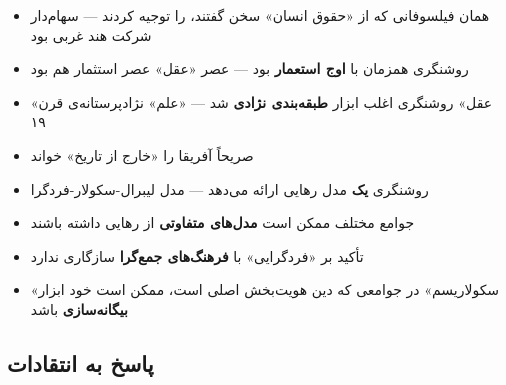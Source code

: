 \begin{tcolorbox}[enemybox, title={نقد ۲: تناقض درونی}]
\begin{itemize}
\item همان فیلسوفانی که از «حقوق انسان» سخن گفتند، 
  را توجیه کردند —  سهام‌دار شرکت هند غربی بود
\item روشنگری همزمان با \textbf{اوج استعمار} بود — عصر «عقل» عصر
  استثمار هم بود
\item «عقل» روشنگری اغلب ابزار \textbf{طبقه‌بندی نژادی} شد — «علم»
  نژادپرستانه‌ی قرن ۱۹
\item {} صریحاً آفریقا را «خارج از تاریخ» خواند
\end{itemize}
\end{tcolorbox}

\begin{tcolorbox}[enemybox, title={نقد ۳: نادیده‌گرفتن تنوع}]
\begin{itemize}
\item روشنگری \textbf{یک} مدل رهایی ارائه می‌دهد — مدل لیبرال-سکولار-فردگرا
\item جوامع مختلف ممکن است \textbf{مدل‌های متفاوتی} از رهایی داشته باشند
\item تأکید بر «فردگرایی» با \textbf{فرهنگ‌های جمع‌گرا} سازگاری ندارد
\item «سکولاریسم» در جوامعی که دین هویت‌بخش اصلی است، ممکن است خود ابزار
  \textbf{بیگانه‌سازی} باشد
\end{itemize}
\end{tcolorbox}


\subsection{پاسخ به انتقادات}

